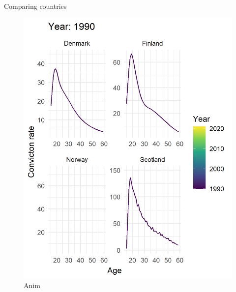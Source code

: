 \documentclass[
  ignorenonframetext,
]{beamer}
\begin{document}
\begin{frame}{Comparing countries}
\protect\hypertarget{comparing-countries}{}
\begin{figure}

{\centering \includegraphics{figures/acc_anim.gif}

}

\caption{Anim}

\end{figure}
\end{frame}
\end{document}
